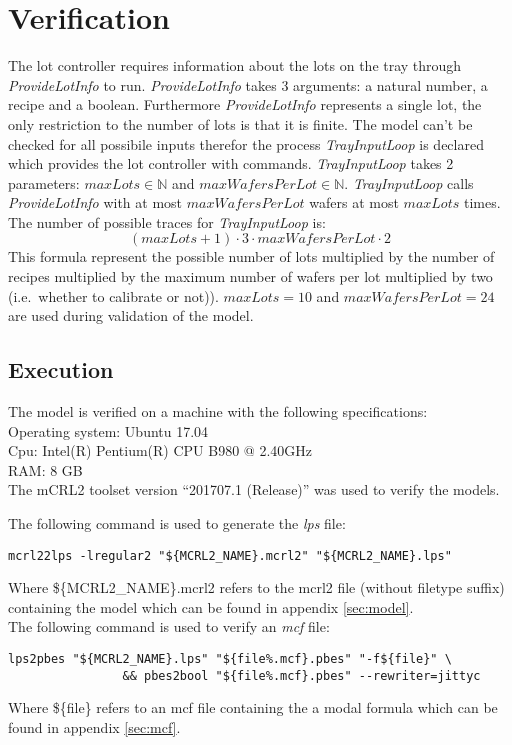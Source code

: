 \section{Verification}\label{sec:results}
The lot controller requires information about the lots on the tray through \textit{ProvideLotInfo} to run. \textit{ProvideLotInfo} takes 3 arguments: a natural number, a recipe and a boolean. Furthermore \textit{ProvideLotInfo} represents a single lot, the only restriction to the number of lots is that it is finite. The model can't be checked for all possibile inputs therefor the process \textit{TrayInputLoop} is declared which provides the lot controller with  commands. \textit{TrayInputLoop} takes 2 parameters: $\mathit{maxLots} \in \mathbb{N}$ and $\mathit{maxWafersPerLot} \in \mathbb{N}$. \textit{TrayInputLoop} calls \textit{ProvideLotInfo} with at most $\mathit{maxWafersPerLot}$ wafers at most $\mathit{maxLots}$ times. The number of possible traces for \textit{TrayInputLoop} is:
$$(\mathit{maxLots}+1) \cdot 3 \cdot \mathit{maxWafersPerLot} \cdot 2$$
This formula represent the possible number of lots multiplied by the number of recipes multiplied by the maximum number of wafers per lot multiplied by two (i.e.\ whether to calibrate or not)). $\mathit{maxLots} = 10$ and $\mathit{maxWafersPerLot} = 24$ are used during validation of the model.

\subsection{Execution}
The model is verified on a machine with the following specifications:\\
Operating system: Ubuntu 17.04\\
Cpu: Intel(R) Pentium(R) CPU B980 @ 2.40GHz\\
RAM: 8 GB\\

The mCRL2 toolset version ``201707.1 (Release)'' was used to verify the models.

The following command is used to generate the \textit{lps} file:\\
\begin{lstlisting}[style=sh,caption={mcf2lps}] 
mcrl22lps -lregular2 "${MCRL2_NAME}.mcrl2" "${MCRL2_NAME}.lps"
\end{lstlisting}
Where \$\{MCRL2\_NAME\}.mcrl2 refers to the mcrl2 file (without filetype suffix) containing the model which can be found in appendix \ref{sec:model}.\\
The following command is used to verify an \textit{mcf} file:\\
\begin{lstlisting}[style=sh,caption={mcf check}] 
lps2pbes "${MCRL2_NAME}.lps" "${file%.mcf}.pbes" "-f${file}" \
                && pbes2bool "${file%.mcf}.pbes" --rewriter=jittyc
\end{lstlisting}
Where \$\{file\} refers to an mcf file containing the a modal formula which can be found in appendix \ref{sec:mcf}.\\
